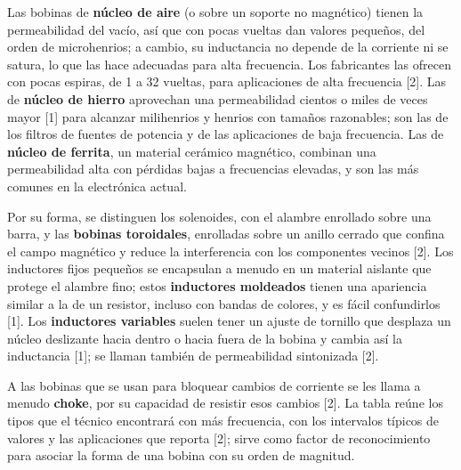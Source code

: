 \documentclass[11pt,letterpaper]{article}
\begin{document}
Las bobinas de \textbf{núcleo de aire} (o sobre un soporte no magnético) tienen la permeabilidad del vacío, así que con pocas vueltas dan valores pequeños, del orden de microhenrios; a cambio, su inductancia no depende de la corriente ni se satura, lo que las hace adecuadas para alta frecuencia. Los fabricantes las ofrecen con pocas espiras, de 1 a 32 vueltas, para aplicaciones de alta frecuencia [2]. Las de \textbf{núcleo de hierro} aprovechan una permeabilidad cientos o miles de veces mayor [1] para alcanzar milihenrios y henrios con tamaños razonables; son las de los filtros de fuentes de potencia y de las aplicaciones de baja frecuencia. Las de \textbf{núcleo de ferrita}, un material cerámico magnético, combinan una permeabilidad alta con pérdidas bajas a frecuencias elevadas, y son las más comunes en la electrónica actual.

Por su forma, se distinguen los solenoides, con el alambre enrollado sobre una barra, y las \textbf{bobinas toroidales}, enrolladas sobre un anillo cerrado que confina el campo magnético y reduce la interferencia con los componentes vecinos [2]. Los inductores fijos pequeños se encapsulan a menudo en un material aislante que protege el alambre fino; estos \textbf{inductores moldeados} tienen una apariencia similar a la de un resistor, incluso con bandas de colores, y es fácil confundirlos [1]. Los \textbf{inductores variables} suelen tener un ajuste de tornillo que desplaza un núcleo deslizante hacia dentro o hacia fuera de la bobina y cambia así la inductancia [1]; se llaman también de permeabilidad sintonizada [2].

A las bobinas que se usan para bloquear cambios de corriente se les llama a menudo \textbf{choke}, por su capacidad de resistir esos cambios [2]. La tabla reúne los tipos que el técnico encontrará con más frecuencia, con los intervalos típicos de valores y las aplicaciones que reporta [2]; sirve como \guillemotleft{}factor de reconocimiento\guillemotright{} para asociar la forma de una bobina con su orden de magnitud.
\end{document}
